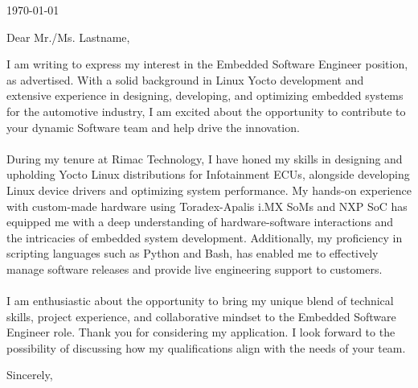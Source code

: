 \documentclass[10pt, a4paper]{article}
\begin{document}
\makeprofile %

\makecontact %

\today %

\makeemployerinfo %

Dear Mr./Ms. Lastname,

I am writing to express my interest in the Embedded Software Engineer position, as advertised. With a solid background in Linux Yocto development and extensive experience in designing, developing, and optimizing embedded systems for the automotive industry, I am excited about the opportunity to contribute to your dynamic Software team and help drive the innovation.
\\\\
During my tenure at Rimac Technology, I have honed my skills in designing and upholding Yocto Linux distributions for Infotainment ECUs, alongside developing Linux device drivers and optimizing system performance. My hands-on experience with custom-made hardware using Toradex-Apalis i.MX SoMs and NXP SoC has equipped me with a deep understanding of hardware-software interactions and the intricacies of embedded system development. Additionally, my proficiency in scripting languages such as Python and Bash, has enabled me to effectively manage software releases and provide live engineering support to customers.
\\\\
I am enthusiastic about the opportunity to bring my unique blend of technical skills, project experience, and collaborative mindset to the Embedded Software Engineer role. Thank you for considering my application. I look forward to the possibility of discussing how my qualifications align with the needs of your team.




Sincerely,

{\name}
\end{document}
